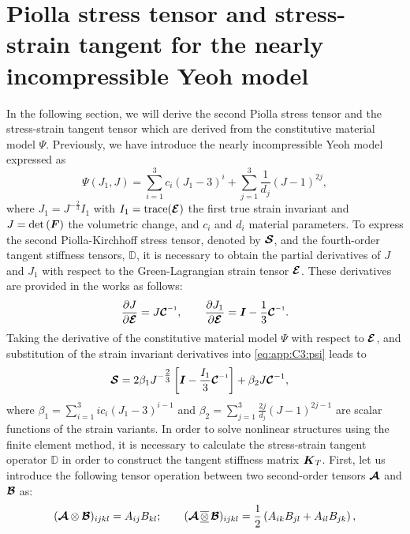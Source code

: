 \section{Piolla stress tensor and stress-strain tangent for the nearly incompressible Yeoh model} 
\label{app:C3:yeohmodel}
In the following section, we will derive the second Piolla stress tensor and the stress-strain tangent tensor which are derived from the constitutive material model $\Psi$. Previously, we have introduce the nearly incompressible Yeoh model expressed as
%
\begin{equation}
\Psi(J_1,J) = \sum_{i = 1}^{3} c_i (J_1 - 3)^i + \sum_{j = 1}^{3} \frac{1}{d_j} (J - 1)^{2j},
\label{eq:app:C3:psi}
\end{equation}
%
where $J_1 = J^{-\tfrac{2}{3}} I_1$ with $I_1 = \text{trace}({\boldsymbol{\mathcal{E}}})$ the first true strain invariant and $J = \textnormal{det}\left( {{\boldsymbol{F}}} \right)$ the volumetric change, and $c_i$ and $d_i$ material parameters. To express the second Piolla-Kirchhoff stress tensor, denoted by $\boldsymbol{\mathcal{S}}$, and the fourth-order tangent stiffness tensors, $\mathbb{D}$, it is necessary to obtain the partial derivatives of $J$ and $J_1$ with respect to the Green-Lagrangian strain tensor $\boldsymbol{\mathcal{E}}$.  These derivatives are provided in the works \cite{Kim2018,Renaud2011} as follows: 
%
\begin{equation}
\frac{\p J}{\p \ten{E}} = J \ten{C}\inv, \quad \quad
\frac{\p J_1}{\p \ten{E}} = \IB - \frac{1}{3} \ten{C}\inv.
\end{equation}
%
Taking the derivative of the constitutive material model $\Psi$ with respect to $\boldsymbol{\mathcal{E}}$, and substitution of the strain invariant derivatives into \eqref{eq:app:C3:psi} leads to 
%
\begin{align}
\ten{S} = 2\beta_{1} J^{-\tfrac{2}{3}}\left[\IB - \frac{I_1}{3}\CT\inv \right] & + \beta_2 J \ten{C}^{-1},
\label{eq:app:C3:secondPiollastress}
\end{align}
%
where $\beta_1 = \sum_{i=1}^3 i {c_i} (J_1 - 3)^{i-1} $ and $\beta_2 = \sum_{j=1}^3 \frac{2j}{d_j} \left(J - 1\right)^{2j - 1}$ are scalar functions of the strain variants. In order to solve nonlinear structures using the finite element method, it is necessary to calculate the stress-strain tangent operator $\mathbb{D}$ in order to construct the tangent stiffness matrix ${\boldsymbol{K}}_T$. First, let us introduce the following tensor operation between two second-order tensors ${\boldsymbol{\mathcal{A}}}$ and ${\boldsymbol{\mathcal{B}}}$ as: 
%
\begin{equation}
({\boldsymbol{\mathcal{A}}} \otimes {\boldsymbol{\mathcal{B}}})_{ijkl} = A_{ij} B_{kl}; \quad \quad ({\boldsymbol{\mathcal{A}}} \,\overline{\underline{\otimes}}\, {\boldsymbol{\mathcal{B}}})_{ijkl} = \frac{1}{2}\left(A_{ik} B_{jl} + A_{il}B_{jk} \right),
\end{equation}
